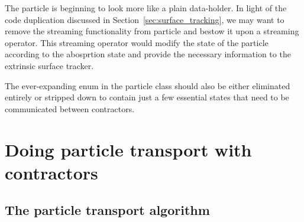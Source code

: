 \documentclass[memo]{ResearchNote}
\begin{document}
The particle is beginning to look more like a plain data-holder. In
light of the code duplication discussed in
Section~\ref{sec:surface_tracking}, we may want to remove the
streaming functionality from particle and bestow it upon a streaming
operator. This streaming operator would modify the state of the
particle according to the abosprtion state and provide the necessary
information to the extrinsic surface tracker.

The ever-expanding enum in the particle class should also be either
eliminated entirely or stripped down to contain just a few essential
states that need to be communicated between contractors.


\section{Doing particle transport with contractors}
\label{sec:particle_transport}

\subsection{The particle transport algorithm}
\end{document}

